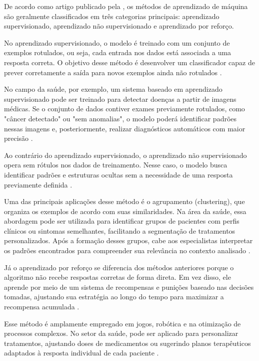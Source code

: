 De acordo como artigo publicado pela , os métodos de aprendizado de máquina são geralmente classificados em três categorias principais: aprendizado supervisionado, aprendizado não supervisionado e aprendizado por reforço.

No aprendizado supervisionado, o modelo é treinado com um conjunto de exemplos rotulados, ou seja, cada entrada nos dados está associada a uma resposta correta. O objetivo desse método é desenvolver um classificador capaz de prever corretamente a saída para novos exemplos ainda não rotulados \cite{ludermir2021inteligencia}.

No campo da saúde, por exemplo, um sistema baseado em aprendizado supervisionado pode ser treinado para detectar doenças a partir de imagens médicas. Se o conjunto de dados contiver exames previamente rotulados, como "câncer detectado" ou "sem anomalias", o modelo poderá identificar padrões nessas imagens e, posteriormente, realizar diagnósticos automáticos com maior precisão \cite{ludermir2021inteligencia}.

Ao contrário do aprendizado supervisionado, o aprendizado não supervisionado opera sem rótulos nos dados de treinamento. Nesse caso, o modelo busca identificar padrões e estruturas ocultas sem a necessidade de uma resposta previamente definida \cite{ludermir2021inteligencia}.

Uma das principais aplicações desse método é o agrupamento (clustering), que organiza os exemplos de acordo com suas similaridades. Na área da saúde, essa abordagem pode ser utilizada para identificar grupos de pacientes com perfis clínicos ou sintomas semelhantes, facilitando a segmentação de tratamentos personalizados. Após a formação desses grupos, cabe aos especialistas interpretar os padrões encontrados para compreender sua relevância no contexto analisado \cite{ludermir2021inteligencia}.

Já o aprendizado por reforço se diferencia dos métodos anteriores porque o algoritmo não recebe respostas corretas de forma direta. Em vez disso, ele aprende por meio de um sistema de recompensas e punições baseado nas decisões tomadas, ajustando sua estratégia ao longo do tempo para maximizar a recompensa acumulada \cite{ludermir2021inteligencia}.

Esse método é amplamente empregado em jogos, robótica e na otimização de processos complexos. No setor da saúde, pode ser aplicado para personalizar tratamentos, ajustando doses de medicamentos ou sugerindo planos terapêuticos adaptados à resposta individual de cada paciente \cite{ludermir2021inteligencia}.

